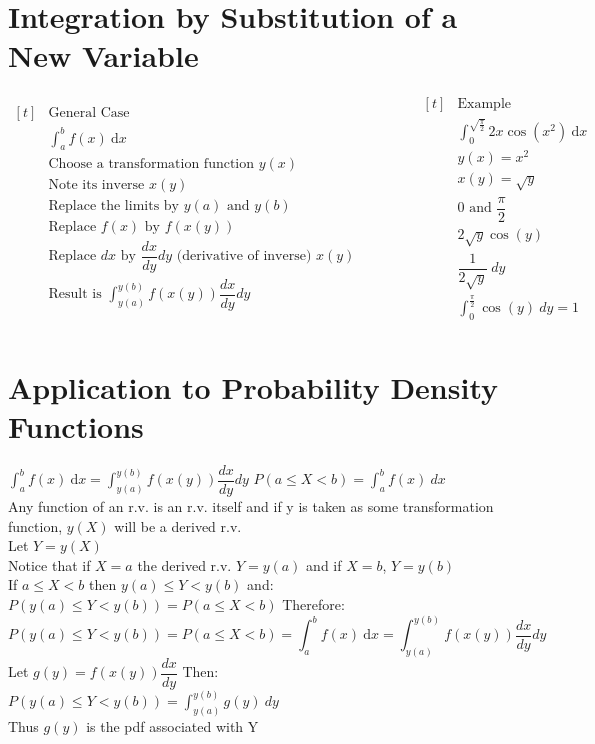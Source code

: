 \documentclass[openany]{book}
\newcommand{\dx}{\mathrm{d}x}
\begin{document}
\begin{flushleft}
\section{Integration by Substitution of a New Variable}
\begin{equation*}
\begin{aligned}[t]
&\text{General Case} \\
&\int_{a}^{b}f(x)\ \dx \\
&\text{Choose a transformation function } y(x)\\
&\text{Note its inverse } x(y)\\
&\text{Replace the limits by } y(a) \text{ and } y(b)\\
&\text{Replace } f(x) \text{ by } f(x(y))\\
&\text{Replace } dx \text{ by } \dfrac{dx}{dy}dy \text{ (derivative of inverse) } x(y)\\
&\text{Result is } \int_{y(a)}^{y(b)}f(x(y))\dfrac{dx}{dy}dy\\
\end{aligned}
\qquad \qquad
\begin{aligned}[t]
&\text{Example}\\
&\int_{0}^{\sqrt{\frac{\pi}{2}}}2x\cos(x^2)\ \dx\\
& y(x)=x^2\\
& x(y)=\sqrt{y}\\
& 0 \text{ and } \dfrac{\pi}{2}\\
& 2 \sqrt{y} \cos(y)\\
& \dfrac{1}{2\sqrt{y}} \ dy\\
&\int_{0}^{\frac{\pi}{2}} \cos(y) \ dy=1\\
\end{aligned}
\end{equation*}
\section{Application to Probability Density Functions}
$\int_{a}^{b}f(x) \ \dx=\int_{y(a)}^{y(b)}f(x(y))\dfrac{dx}{dy}dy$\medbreak
$P(a\leq X<b)=\int_{a}^{b}f(x)\ dx$\\
Any function of an r.v. is an r.v. itself and if y is taken as some transformation function, $y(X)$ will be a derived r.v.\\
Let $Y=y(X)$\\
Notice that if $X=a$ the derived r.v. $Y=y(a)$ and if $X=b$, $Y=y(b)$\\
If $a\leq X <b$ then $y(a)\leq Y<y(b)$ and:\\
$P(y(a)\leq Y<y(b))=P(a\leq X<b)$ Therefore:
\[P(y(a)\leq Y<y(b))=P(a\leq X<b)=\int_{a}^{b}f(x) \ \dx=\int_{y(a)}^{y(b)}f(x(y))\dfrac{dx}{dy}dy
\]
Let $g(y)=f(x(y))\dfrac{dx}{dy}$ Then:\\
$P(y(a)\leq Y<y(b))=\int_{y(a)}^{y(b)}g(y) \ dy$\\
Thus $g(y)$ is the pdf associated with Y

\end{flushleft}
\end{document}
